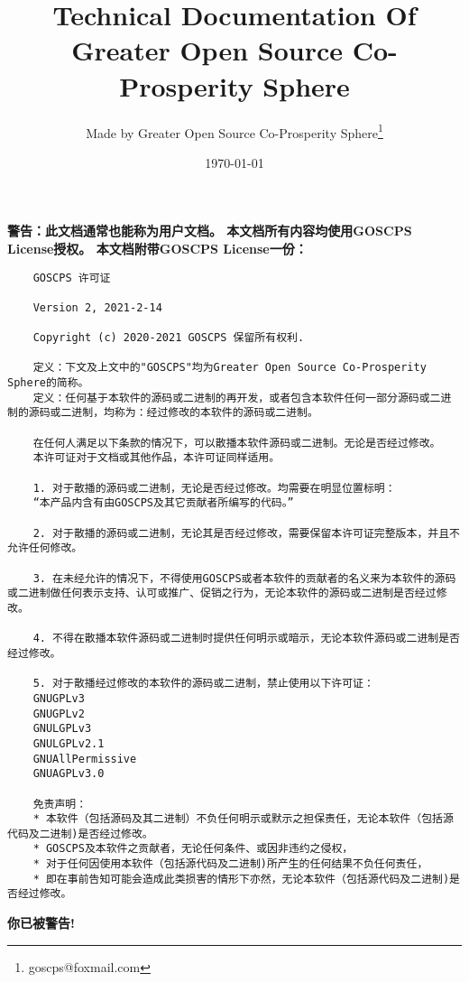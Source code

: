 \documentclass[UTF-8,twoside,a4paper,final,titlepage]{ctexbook}
\begin{document}
	\frontmatter{}
	
	\title{Technical Documentation Of Greater Open Source Co-Prosperity Sphere} 
	\author{Made by Greater Open Source Co-Prosperity Sphere\thanks{goscps@foxmail.com}}
	\date{\today}
	\maketitle
	
	\textbf{警告：此文档通常也能称为用户文档。
		本文档所有内容均使用GOSCPS License授权。\newline{}
		本文档附带GOSCPS License一份：}
	\begin{lstlisting}
	GOSCPS 许可证

	Version 2, 2021-2-14

	Copyright (c) 2020-2021 GOSCPS 保留所有权利.

	定义：下文及上文中的"GOSCPS"均为Greater Open Source Co-Prosperity Sphere的简称。
	定义：任何基于本软件的源码或二进制的再开发，或者包含本软件任何一部分源码或二进制的源码或二进制，均称为：经过修改的本软件的源码或二进制。

	在任何人满足以下条款的情况下，可以散播本软件源码或二进制。无论是否经过修改。
	本许可证对于文档或其他作品，本许可证同样适用。

	1. 对于散播的源码或二进制，无论是否经过修改。均需要在明显位置标明：
	“本产品内含有由GOSCPS及其它贡献者所编写的代码。”

	2. 对于散播的源码或二进制，无论其是否经过修改，需要保留本许可证完整版本，并且不允许任何修改。

	3. 在未经允许的情况下，不得使用GOSCPS或者本软件的贡献者的名义来为本软件的源码或二进制做任何表示支持、认可或推广、促销之行为，无论本软件的源码或二进制是否经过修改。

	4. 不得在散播本软件源码或二进制时提供任何明示或暗示，无论本软件源码或二进制是否经过修改。

	5. 对于散播经过修改的本软件的源码或二进制，禁止使用以下许可证：
	GNUGPLv3
	GNUGPLv2
	GNULGPLv3
	GNULGPLv2.1
	GNUAllPermissive
	GNUAGPLv3.0

	免责声明：
	* 本软件（包括源码及其二进制）不负任何明示或默示之担保责任，无论本软件（包括源代码及二进制)是否经过修改。
	* GOSCPS及本软件之贡献者，无论任何条件、或因非违约之侵权，
	* 对于任何因使用本软件（包括源代码及二进制)所产生的任何结果不负任何责任，
	* 即在事前告知可能会造成此类损害的情形下亦然，无论本软件（包括源代码及二进制)是否经过修改。
	\end{lstlisting}
	\textbf{你已被警告!}
	
	\tableofcontents
	
	\mainmatter{}
	
	
	
	\backmatter{}
	
	
	
	\printindex
	
\end{document}
